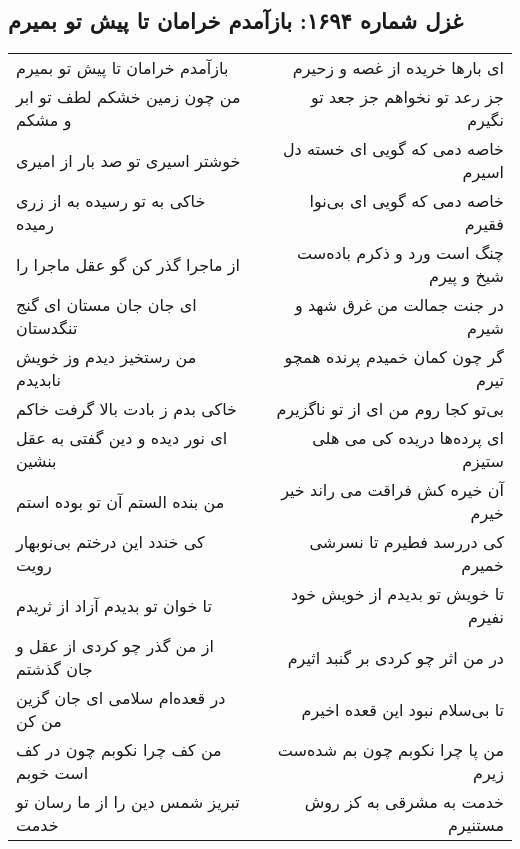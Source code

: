 \begin{center}
\section*{غزل شماره ۱۶۹۴: بازآمدم خرامان تا پیش تو بمیرم}
\label{sec:1694}
\begin{longtable}{l p{0.5cm} r}
بازآمدم خرامان تا پیش تو بمیرم
&&
ای بارها خریده از غصه و زحیرم
\\
من چون زمین خشکم لطف تو ابر و مشکم
&&
جز رعد تو نخواهم جز جعد تو نگیرم
\\
خوشتر اسیری تو صد بار از امیری
&&
خاصه دمی که گویی ای خسته دل اسیرم
\\
خاکی به تو رسیده به از زری رمیده
&&
خاصه دمی که گویی ای بی‌نوا فقیرم
\\
از ماجرا گذر کن گو عقل ماجرا را
&&
چنگ است ورد و ذکرم باده‌ست شیخ و پیرم
\\
ای جان جان مستان ای گنج تنگدستان
&&
در جنت جمالت من غرق شهد و شیرم
\\
من رستخیز دیدم وز خویش نابدیدم
&&
گر چون کمان خمیدم پرنده همچو تیرم
\\
خاکی بدم ز بادت بالا گرفت خاکم
&&
بی‌تو کجا روم من ای از تو ناگزیرم
\\
ای نور دیده و دین گفتی به عقل بنشین
&&
ای پرده‌ها دریده کی می هلی ستیزم
\\
من بنده الستم آن تو بوده استم
&&
آن خیره کش فراقت می راند خیر خیرم
\\
کی خندد این درختم بی‌نوبهار رویت
&&
کی دررسد فطیرم تا نسرشی خمیرم
\\
تا خوان تو بدیدم آزاد از ثریدم
&&
تا خویش تو بدیدم از خویش خود نفیرم
\\
از من گذر چو کردی از عقل و جان گذشتم
&&
در من اثر چو کردی بر گنبد اثیرم
\\
در قعده‌ام سلامی ای جان گزین من کن
&&
تا بی‌سلام نبود این قعده اخیرم
\\
من کف چرا نکوبم چون در کف است خوبم
&&
من پا چرا نکوبم چون بم شده‌ست زیرم
\\
تبریز شمس دین را از ما رسان تو خدمت
&&
خدمت به مشرقی به کز روش مستنیرم
\\
\end{longtable}
\end{center}
